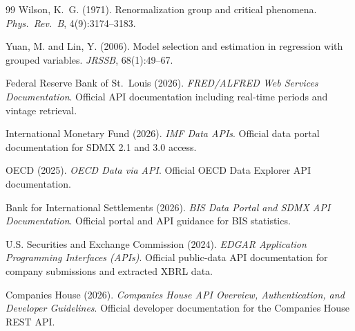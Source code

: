 \documentclass[11pt,a4paper]{article}
\theoremstyle{definition}
\begin{document}
\begin{thebibliography}{99}
Wilson, K.~G. (1971). Renormalization group and critical phenomena. \emph{Phys.\ Rev.\ B}, 4(9):3174--3183.

Yuan, M. and Lin, Y. (2006). Model selection and estimation in regression with grouped variables. \emph{JRSSB}, 68(1):49--67.

Federal Reserve Bank of St.\ Louis (2026). \emph{FRED/ALFRED Web Services Documentation}. Official API documentation including real-time periods and vintage retrieval.

International Monetary Fund (2026). \emph{IMF Data APIs}. Official data portal documentation for SDMX 2.1 and 3.0 access.

OECD (2025). \emph{OECD Data via API}. Official OECD Data Explorer API documentation.

Bank for International Settlements (2026). \emph{BIS Data Portal and SDMX API Documentation}. Official portal and API guidance for BIS statistics.

U.S. Securities and Exchange Commission (2024). \emph{EDGAR Application Programming Interfaces (APIs)}. Official public-data API documentation for company submissions and extracted XBRL data.

Companies House (2026). \emph{Companies House API Overview, Authentication, and Developer Guidelines}. Official developer documentation for the Companies House REST API.

\end{thebibliography}
\end{document}
